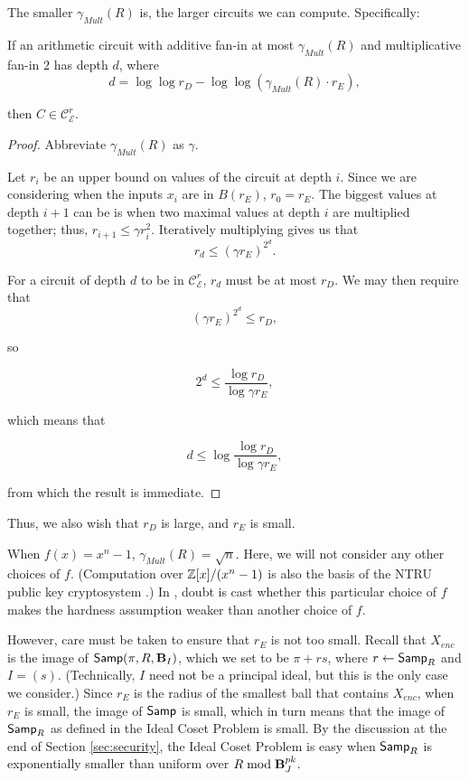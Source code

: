 The smaller $\gamma_{Mult}(R)$ is, the larger circuits we can compute. Specifically:
\begin{lemma}
If an arithmetic circuit with additive fan-in at most $\gamma_{Mult}(R)$ and multiplicative fan-in $2$ has depth $d$, where
\[d = \log \log r_D - \log \log (\gamma_{Mult}(R) \cdot r_E),\]

then $C \in \mathcal{C}_\mathcal{E}^r$.
\end{lemma}

\begin{proof}
Abbreviate $\gamma_{Mult}(R)$ as $\gamma$.

Let $r_i$ be an upper bound on values of the circuit at depth $i$. Since we are considering when the inputs $x_i$ are in $B(r_E)$, $r_0 = r_E$. The biggest values at depth $i+1$ can be is when two maximal values at depth $i$ are multiplied together; thus, $r_{i+1} \leq \gamma r_i^2$. Iteratively multiplying gives us that
\[r_d \leq (\gamma r_E)^{2^d}.\]

For a circuit of depth $d$ to be in $\mathcal{C}_\mathcal{E}^r$, $r_d$ must be at most $r_D$. We may then require that
\[(\gamma r_E)^{2^d} \leq r_D,\]

so

\[2^d \leq \frac{\log r_D}{\log \gamma r_E},\]

which means that

\[d \leq \log \frac{\log r_D}{\log \gamma r_E},\]

from which the result is immediate.
\end{proof}

Thus, we also wish that $r_D$ is large, and $r_E$ is small.

When $f(x) = x^n - 1$, $\gamma_{Mult}(R) = \sqrt{n}$. Here, we will not consider any other choices of $f$. (Computation over $\mathbb{Z}[x] / (x^n - 1)$ is also the basis of the NTRU public key cryptosystem \cite{1998ntru}.) In \cite{gentry2009fully}, doubt is cast whether this particular choice of $f$ makes the hardness assumption weaker than another choice of $f$.


However, care must be taken to ensure that $r_E$ is not too small. Recall that $X_{enc}$ is the image of ${\sf Samp}(\pi, R, \textbf{B}_I)$, which we set to be $\pi + rs$, where $r \leftarrow {\sf Samp}_R$ and $I = (s)$. (Technically, $I$ need not be a principal ideal, but this is the only case we consider.) Since $r_E$ is the radius of the smallest ball that contains $X_{enc}$, when $r_E$ is small, the image of ${\sf Samp}$ is small, which in turn means that the image of ${\sf Samp}_R$ as defined in the Ideal Coset Problem is small. By the discussion at the end of Section \ref{sec:security}, the Ideal Coset Problem is easy when ${\sf Samp}_R$ is exponentially smaller than uniform over $R \bmod \textbf{B}_J^{pk}$.



